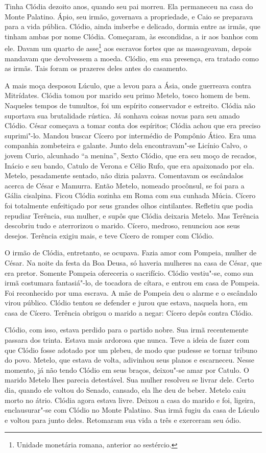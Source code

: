 Tinha Clódia dezoito anos, quando seu pai morreu. Ela permaneceu na casa do
Monte Palatino. Ápio, seu irmão, governava a propriedade, e Caio se
preparava para a vida pública. Clódio, ainda imberbe e delicado, dormia
entre as irmãs, que tinham ambas por nome Clódia. Começaram, às
escondidas, a ir aos banhos com ele. Davam um quarto de asse\footnote{
Unidade monetária romana, anterior ao sestércio.} aos escravos
fortes que as massageavam, depois mandavam que devolvessem a moeda.
Clódio, em sua presença, era tratado como as irmãs. Tais foram os prazeres
deles antes do casamento.

A mais moça desposou Lúculo, que a levou para a Ásia, onde guerreava contra
Mitrídates. Clódia tomou por marido seu primo Metelo, tosco homem de bem.
Naqueles tempos de tumultos, foi um espírito conservador e estreito.
Clódia não suportava sua brutalidade rústica. Já sonhava coisas novas para
seu amado Clódio. César começava a tomar conta dos espíritos; Clódia achou
que era preciso suprimi"-lo. Mandou buscar Cícero por intermédio de
Pompônio Ático. Era uma companhia zombeteira e galante. Junto dela
encontravam"-se Licínio Calvo, o jovem Curio, alcunhado “a menina”, Sexto
Clódio, que era seu moço de recados, Inácio e seu bando, Catulo de Verona
e Célio Rufo, que era apaixonado por ela. Metelo, pesadamente sentado, não
dizia palavra. Comentavam os escândalos acerca de César e Mamurra. Então
Metelo, nomeado procônsul, se foi para a Gália cisalpina. Ficou Clódia
sozinha em Roma com sua cunhada Múcia. Cícero foi totalmente enfeitiçado
por seus grandes olhos cintilantes. Refletiu que podia repudiar Terência,
sua mulher, e supôs que Clódia deixaria Metelo. Mas Terência descobriu
tudo e aterrorizou o marido. Cícero, medroso, renunciou aos seus desejos.
Terência exigiu mais, e teve Cícero de romper com Clódio.

O irmão de Clódia, entretanto, se ocupava. Fazia amor com Pompeia, mulher   \EP[1]%
de César. Na noite da festa da Boa Deusa, só haveria mulheres na casa de
César, que era pretor. Somente Pompeia ofereceria o sacrifício. Clódio
vestiu"-se, como sua irmã costumara fantasiá"-lo, de tocadora de cítara, e
entrou em casa de Pompeia. Foi reconhecido por uma escrava. A mãe de
Pompeia deu o alarme e o escândalo virou público. Clódio tentou se
defender e jurou que estava, naquela hora, em casa de Cícero. Terência
obrigou o marido a negar: Cícero depôs contra Clódio.

Clódio, com isso, estava perdido para o partido nobre. Sua irmã
recentemente passara dos trinta. Estava mais ardorosa que nunca. Teve a
ideia de fazer com que Clódio fosse adotado por um plebeu, de modo que
pudesse se tornar tribuno do povo. Metelo, que estava de volta, adivinhou
seus planos e escarneceu. Nesse momento, já não tendo Clódio em seus
braços, deixou"-se amar por Catulo. O marido Metelo lhes parecia
detestável. Sua mulher resolveu se livrar dele. Certo dia, quando ele
voltou do Senado, cansado, ela lhe deu de beber. Metelo caiu morto no
átrio. Clódia agora estava livre. Deixou a casa do marido e foi, ligeira,
enclausurar"-se com Clódio no Monte Palatino. Sua irmã fugiu da casa de
Lúculo e voltou para junto deles. Retomaram sua vida a três e exerceram
seu ódio.

